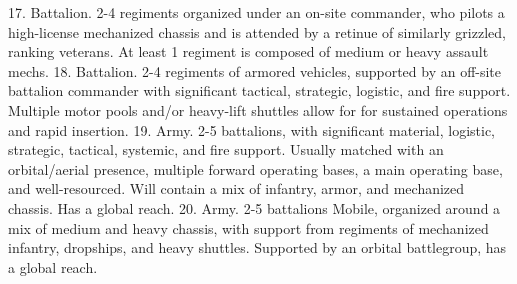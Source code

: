 17. Battalion. 2-4 regiments organized under an on-site commander, who pilots a high-license
    mechanized chassis and is attended by a retinue of similarly grizzled, ranking veterans. At
    least 1 regiment is composed of medium or heavy assault mechs.
18. Battalion. 2-4 regiments of armored vehicles, supported by an off-site battalion
    commander with significant tactical, strategic, logistic, and fire support. Multiple motor
    pools and/or heavy-lift shuttles allow for for sustained operations and rapid insertion.
19. Army. 2-5 battalions, with significant material, logistic, strategic, tactical, systemic, and fire
    support. Usually matched with an orbital/aerial presence, multiple forward operating
    bases, a main operating base, and well-resourced. Will contain a mix of infantry, armor,
    and mechanized chassis. Has a global reach.
20. Army. 2-5 battalions Mobile, organized around a mix of medium and heavy chassis, with
    support from regiments of mechanized infantry, dropships, and heavy shuttles. Supported
    by an orbital battlegroup, has a global reach.



